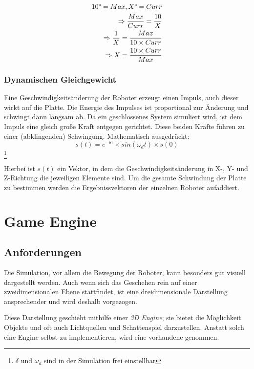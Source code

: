 \begin{align}\label{eq:tilt-from-maxtilt}
10\degree = Max, X\degree = Curr \\
\Rightarrow \frac{Max}{Curr} = \frac{10}{X} \\
\Rightarrow \frac{1}{X} = \frac{Max}{10 \times Curr} \\
\Rightarrow X = \frac{10 \times Curr}{Max}
\end{align}

\subsubsection{Dynamischen Gleichgewicht}
Eine Geschwindigkeits{\"{a}}nderung der Roboter erzeugt einen Impuls, auch dieser wirkt auf die Platte. Die Energie des Impulses ist proportional zur
{\"{A}}nderung und schwingt dann langsam ab. Da ein geschlossenes System simuliert wird, ist dem Impuls eine gleich gro{\ss}e Kraft entgegen gerichtet.
Diese beiden Kr{\"{a}}fte f{\"{u}}hren zu einer (abklingenden) Schwingung. Mathematisch ausgedr{\"{u}}ckt:
\begin{equation}\label{eq:schwingung}
	s(t) = e^\mathrm{-\delta t} \times sin(\omega_d t) \times s(0)
\end{equation}
\cite{wiki:schwingung}
\footnote{$\delta$ und $\omega_d$ sind in der Simulation frei einstellbar}

Hierbei ist $s(t)$ ein Vektor, in dem die Geschwindigkeits{\"{a}}nderung in X-, Y- und Z-Richtung die jeweiligen Elemente sind. Um die gesamte Schwindung der
Platte zu bestimmen werden die Ergebnissvektoren der einzelnen Roboter aufaddiert.

\clearpage
\section{Game Engine}
\subsection{Anforderungen}
Die Simulation, vor allem die Bewegung der Roboter, kann besonders gut visuell dargestellt werden.
Auch wenn sich das Geschehen rein auf einer zweidimensionalen Ebene stattfindet, ist eine dreidimensionale
Darstellung ansprechender und wird deshalb vorgezogen.

Diese Darstellung geschieht mithilfe einer \textit{3D Engine}; sie bietet die M{\"{o}}glichkeit Objekte und oft 
auch Lichtquellen und Schattenspiel darzustellen. Anstatt solch eine Engine selbst zu implementieren, wird eine 
vorhandene genommen.

